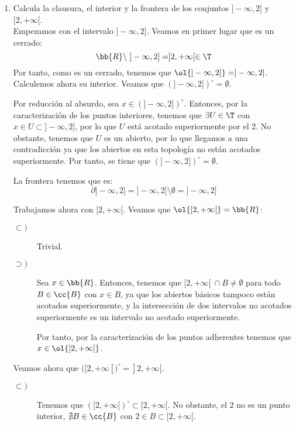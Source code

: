 \begin{ejercicio}
\begin{enumerate}[label=\alph*)]
        \item Calcula la clausura, el interior y la frontera de los conjuntos $]-\infty, 2]$ y $[2,+\infty[$.\\

        Empezamos con el intervalo $]-\infty, 2]$. Veamos en primer lugar que es un cerrado:
        \begin{equation*}
            \bb{R}\setminus~]-\infty, 2] = ]2,+\infty[\in \T
        \end{equation*}
        Por tanto, como es un cerrado, tenemos que $\ol{]-\infty, 2]}=]-\infty, 2]$. 
        Calculemos ahora su interior. Veamos que $(]-\infty, 2])^\circ = \emptyset$.

        Por reducción al absurdo, sea $x\in (]-\infty, 2])^\circ$. Entonces, por la caracterización de los puntos interiores, tenemos que $\exists U\in \T$ con $x\in U\subset ]-\infty, 2]$, por lo que $U$ está acotado superiormente por el 2. No obstante, tenemos que $U$ es un abierto, por lo que llegamos a una contradicción ya que los abiertos en esta topología no están acotados superiormente. Por tanto, se tiene que $(]-\infty, 2])^\circ = \emptyset$.

        La frontera tenemos que es:
        \begin{equation*}
            \partial ]-\infty, 2] = ]-\infty, 2]\setminus \emptyset = ]-\infty, 2]
        \end{equation*}
        \vspace{1cm}

        Trabajamos ahora con $[2,+\infty[$. Veamos que $\ol{[2,+\infty[}=\bb{R}$:
        \begin{description}
            \item[$\subset)$] Trivial.
            \item[$\supset)$] Sea $x\in \bb{R}$. Entonces, tenemos que $[2,+\infty[~\cap B\neq \emptyset$ para todo $B\in \cc{B}$ con $x\in B$, ya que los abiertos básicos tampoco están acotados superiormente, y la intersección de dos intervalos no acotados superiormente es un intervalo no acotado superiormente.
            
            Por tanto, por la caracterización de los puntos adherentes tenemos que $x\in \ol{[2,+\infty[}$.
        \end{description}

        Veamos ahora que $([2,+\infty[)^\circ=]2,+\infty[$.
        \begin{description}
            \item[$\subset)$] Tenemos que $([2,+\infty[)^\circ\subset [2,+\infty[$. No obstante, el 2 no es un punto interior, $\nexists B\in \cc{B}$ con $2\in B\subset [2,+\infty[$.


\end{description}
\end{enumerate}
\end{ejercicio}
